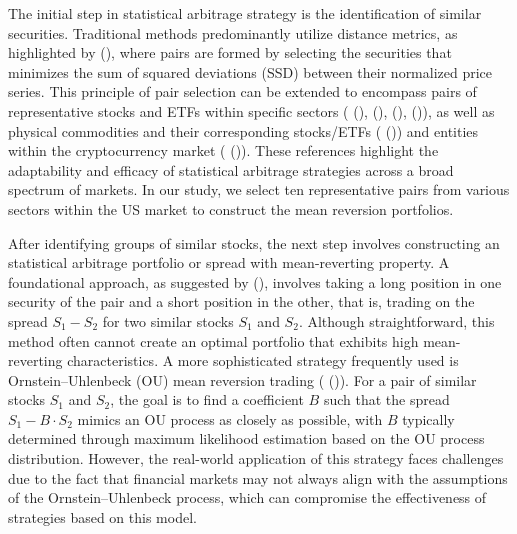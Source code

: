 \documentclass{article}
\begin{document}
The initial step in statistical arbitrage strategy is the identification of similar securities.  Traditional methods predominantly utilize distance metrics, as highlighted by \citeauthor{gatev2006pairs} (\citeyear{gatev2006pairs}), where pairs are formed by selecting the securities that minimizes the sum of squared deviations (SSD) between their normalized price series. This principle of pair selection can be extended to encompass pairs of representative stocks and ETFs within specific sectors (\citeauthor{gatev2006pairs} (\citeyear{gatev2006pairs}), \citeauthor{avellaneda2010statistical} (\citeyear{avellaneda2010statistical}), \citeauthor{Montana2011} (\citeyear{Montana2011}), \citeauthor{meanReversionBook} (\citeyear{meanReversionBook})), as well as physical commodities and their corresponding stocks/ETFs (\citeauthor{kanamura2010profit} (\citeyear{kanamura2010profit})) and entities within the cryptocurrency market (\citeauthor{leung2019constructing} (\citeyear{leung2019constructing})). These references highlight the adaptability and efficacy of statistical arbitrage strategies across a broad spectrum of markets. In our study, we select ten representative pairs from various sectors within the US market to construct the mean reversion portfolios.

After identifying groups of similar stocks, the next step involves constructing an statistical arbitrage portfolio or spread with mean-reverting property. A foundational approach, as suggested by \citeauthor{gatev2006pairs} (\citeyear{gatev2006pairs}), involves taking a long position in one security of the pair and a short position in the other, that is, trading on the spread \(S_1 - S_2\) for two similar stocks \(S_1\) and \(S_2\). Although straightforward, this method often cannot create an optimal portfolio that exhibits high mean-reverting characteristics. A more sophisticated strategy frequently used is Ornstein–Uhlenbeck (OU) mean reversion trading (\citeauthor{meanReversionBook} (\citeyear{meanReversionBook})). For a pair of similar stocks \(S_1\) and \(S_2\), the goal is to find a coefficient \(B\) such that the spread \(S_1- B \cdot S_2\) mimics an OU process as closely as possible, with \(B\) typically determined through maximum likelihood estimation based on the OU process distribution. However, the real-world application of this strategy faces challenges due to the fact that financial markets may not always align with the assumptions of the Ornstein–Uhlenbeck process, which can compromise the effectiveness of strategies based on this model.
\end{document}
